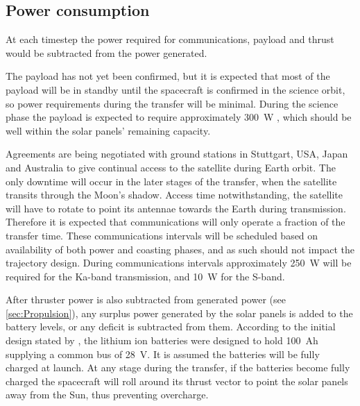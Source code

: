 
\subsection{Power consumption} \label{sub:Power-consumption}

At each timestep the power required for communications, payload and thrust would be subtracted from the power generated. 

The payload has not yet been confirmed, but it is expected that most of the payload will be in standby until the spacecraft is confirmed in the science orbit, so power requirements during the transfer will be minimal. During the science phase the payload is expected to require approximately 300~W \parencite{web_BW-1}, which should be well within the solar panels' remaining capacity.

Agreements are being negotiated with ground stations in Stuttgart, USA, Japan and Australia to give continual access to the satellite during Earth orbit. The only downtime will occur in the later stages of the transfer, when the satellite transits through the Moon's shadow. Access time notwithstanding, the satellite will have to rotate to point its antennae towards the Earth during transmission. Therefore it is expected that communications will only operate a fraction of the transfer time. These communications intervals will be scheduled based on availability of both power and coasting phases, and as such should not impact the trajectory design. During communications intervals approximately 250~W will be required for the Ka-band transmission, and 10~W for the S-band.

After thruster power is also subtracted from generated power (see \autoref{sec:Propulsion}), any surplus power generated by the solar panels is added to the battery levels, or any deficit is subtracted from them. According to the initial design stated by \textcite{Falke2004}, the lithium ion batteries were designed to hold 100~Ah supplying a common bus of 28~V. It is assumed the batteries will be fully charged at launch. At any stage during the transfer, if the batteries become fully charged the spacecraft will roll around its thrust vector to point the solar panels away from the Sun, thus preventing overcharge.


